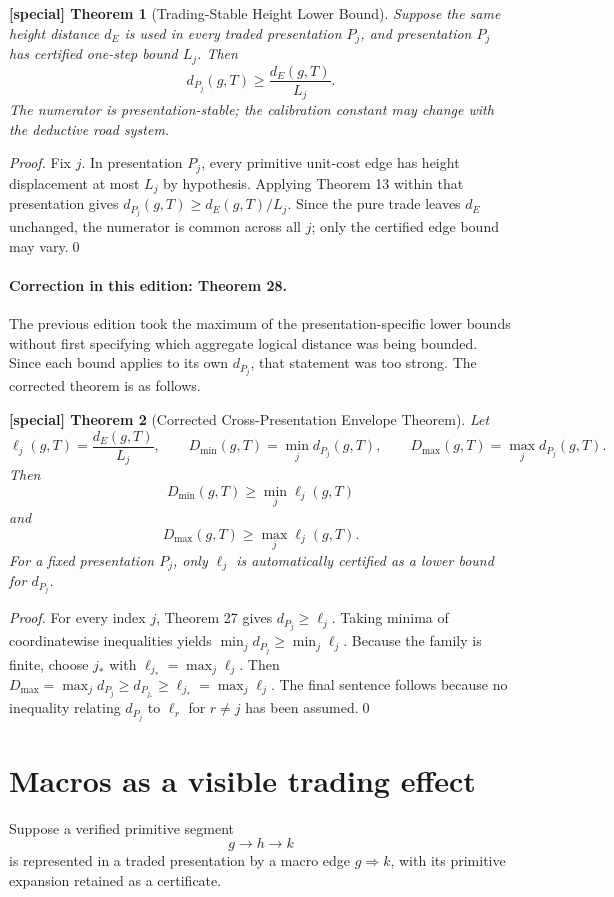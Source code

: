 \documentclass[11pt]{article}
\newtheorem{spthm}{[special] Theorem}
\newcommand{\dE}{d_E}
\begin{document}
\begin{spthm}[Trading-Stable Height Lower Bound]
Suppose the same height distance $\dE$ is used in every traded presentation $P_j$, and presentation $P_j$ has certified one-step bound $L_j$. Then
\[d_{P_j}(g,T)\ge\frac{\dE(g,T)}{L_j}.\]
The numerator is presentation-stable; the calibration constant may change with the deductive road system.
\end{spthm}
\textit{Proof.} Fix $j$. In presentation $P_j$, every primitive unit-cost edge has height displacement at most $L_j$ by hypothesis. Applying Theorem 13 within that presentation gives $d_{P_j}(g,T)\ge \dE(g,T)/L_j$. Since the pure trade leaves $d_E$ unchanged, the numerator is common across all $j$; only the certified edge bound may vary.\qed


\paragraph{Correction in this edition: Theorem 28.}
The previous edition took the maximum of the presentation-specific lower bounds without first specifying which aggregate logical distance was being bounded. Since each bound applies to its own $d_{P_j}$, that statement was too strong. The corrected theorem is as follows.

\begin{spthm}[Corrected Cross-Presentation Envelope Theorem]
Let
\[
\ell_j(g,T)=\frac{\dE(g,T)}{L_j},\qquad
D_{\min}(g,T)=\min_j d_{P_j}(g,T),\qquad
D_{\max}(g,T)=\max_j d_{P_j}(g,T).
\]
Then
\[
D_{\min}(g,T)\ge\min_j\ell_j(g,T)
\]
and
\[
D_{\max}(g,T)\ge\max_j\ell_j(g,T).
\]
For a fixed presentation $P_j$, only $\ell_j$ is automatically certified as a lower bound for $d_{P_j}$.
\end{spthm}
\textit{Proof.} For every index $j$, Theorem 27 gives $d_{P_j}\ge\ell_j$. Taking minima of coordinatewise inequalities yields $\min_jd_{P_j}\ge\min_j\ell_j$. Because the family is finite, choose $j_*$ with $\ell_{j_*}=\max_j\ell_j$. Then $D_{\max}=\max_j d_{P_j}\ge d_{P_{j_*}}\ge\ell_{j_*}=\max_j\ell_j$. The final sentence follows because no inequality relating $d_{P_j}$ to $\ell_r$ for $r\ne j$ has been assumed.\qed


\section{Macros as a visible trading effect}
Suppose a verified primitive segment
\[g\to h\to k\]
is represented in a traded presentation by a macro edge $g\Rightarrow k$, with its primitive expansion retained as a certificate.
\end{document}
